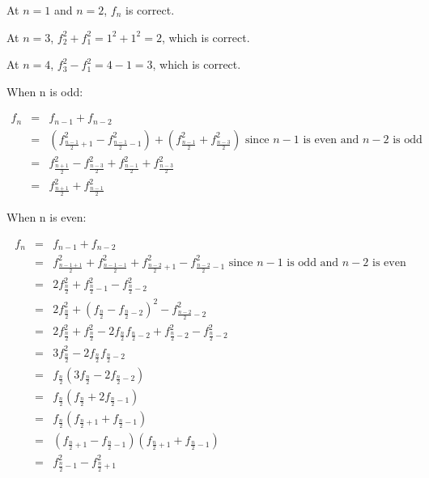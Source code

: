 \documentclass[12pt]{article}
\begin{document}
At $n=1$ and $n=2$, $f_n$ is correct.

At $n=3$, $f_2^2 + f_1^2 = 1^2 + 1^2 = 2$, which is correct.

At $n=4$, $f_3^2 - f_1^2 = 4 - 1 = 3$, which is correct.

When n is odd:

\begin{eqnarray*}
f_n &=& f_{n-1} + f_{n-2} \\
    &=& \left( f_{\frac{n-1}{2}+1}^2 - f_{\frac{n-1}{2}-1}^2 \right)
        + \left( f_{\frac{n-1}{2}}^2 + f_{\frac{n-3}{2}}^2 \right)
	\mbox{ since $n-1$ is even and $n-2$ is odd} \\
    &=& f_{\frac{n+1}{2}}^2 - f_{\frac{n-3}{2}}^2
        + f_{\frac{n-1}{2}}^2 + f_{\frac{n-3}{2}}^2 \\
    &=& f_{\frac{n+1}{2}}^2 + f_{\frac{n-1}{2}}^2
\end{eqnarray*}

When n is even:

\begin{eqnarray*}
f_n &=& f_{n-1} + f_{n-2} \\
    &=& f_{\frac{n-1+1}{2}}^2 + f_{\frac{n-1-1}{2}}^2
        + f_{\frac{n-2}{2}+1}^2 - f_{\frac{n-2}{2}-1}^2
	\mbox{ since $n-1$ is odd and $n-2$ is even} \\
    &=& 2f_{\frac{n}{2}}^2 + f_{\frac{n}{2}-1}^2 - f_{\frac{n}{2}-2}^2 \\
    &=& 2f_{\frac{n}{2}}^2
        + {\left( f_{\frac{n}{2}} - f_{\frac{n}{2}-2} \right)}^2
	- f_{\frac{n-2}{2}-2}^2 \\
    &=& 2f_{\frac{n}{2}}^2 + f_{\frac{n}{2}}^2
        - 2f_{\frac{n}{2}}f_{\frac{n}{2}-2} + f_{\frac{n}{2}-2}^2
	- f_{\frac{n}{2}-2}^2 \\
    &=& 3f_{\frac{n}{2}}^2 - 2f_{\frac{n}{2}}f_{\frac{n}{2}-2} \\
    &=& f_{\frac{n}{2}}
        {\left( 3f_{\frac{n}{2}} - 2f_{\frac{n}{2}-2} \right)} \\
    &=& f_{\frac{n}{2}}{\left( f_{\frac{n}{2}} + 2f_{\frac{n}{2}-1} \right)} \\
    &=& f_{\frac{n}{2}}{\left( f_{\frac{n}{2}+1} + f_{\frac{n}{2}-1} \right)} \\
    &=& {\left( f_{\frac{n}{2}+1} - f_{\frac{n}{2}-1} \right)}
        {\left( f_{\frac{n}{2}+1} + f_{\frac{n}{2}-1} \right)} \\
    &=& f_{\frac{n}{2}-1}^2 - f_{\frac{n}{2}+1}^2
\end{eqnarray*}
\end{document}
